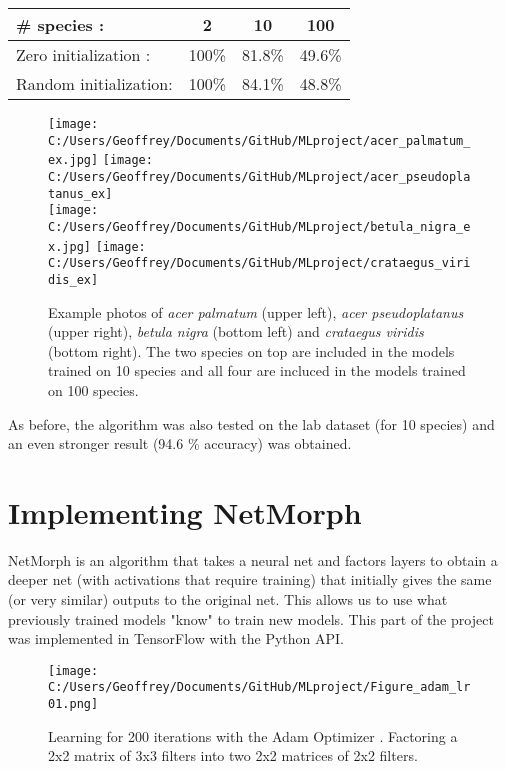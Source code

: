 \documentclass[12pt]{article}
\begin{document}
\begin{center}
\begin{tabular}{|l|c|c|c|}
 \hline
 \# species : & 2 & 10 & 100\\
 \hline
 Zero initialization : & 100\% & 81.8\% & 49.6\%\\
 Random initialization: & 100\% & 84.1\% & 48.8\%\\
 \hline
\end{tabular}
\end{center}

\begin{figure}
\texttt{[image: C:/Users/Geoffrey/Documents/GitHub/MLproject/acer\_palmatum\_ex.jpg]} \texttt{[image: C:/Users/Geoffrey/Documents/GitHub/MLproject/acer\_pseudoplatanus\_ex]} \\ \texttt{[image: C:/Users/Geoffrey/Documents/GitHub/MLproject/betula\_nigra\_ex.jpg]} \texttt{[image: C:/Users/Geoffrey/Documents/GitHub/MLproject/crataegus\_viridis\_ex]}
\caption{\label{fig:exphotosmulti} Example photos of \textit{acer palmatum} (upper left), \textit{acer pseudoplatanus} (upper right), \textit{betula nigra} (bottom left) and \textit{crataegus viridis} (bottom right). The two species on top are included in the models trained on 10 species and all four are incluced in the models trained on 100 species.}
\end{figure}

As before, the algorithm was also tested on the lab dataset (for 10 species) and an even stronger result (94.6 \% accuracy) was obtained.

\section{Implementing NetMorph}

NetMorph \cite{NetMorph} is an algorithm that takes a neural net and factors layers to obtain a deeper net (with activations that require training) that initially gives the same (or very similar) outputs to the original net. This allows us to use what previously trained models "know" to train new models. This part of the project was implemented in TensorFlow with the Python API.

\begin{figure}
\texttt{[image: C:/Users/Geoffrey/Documents/GitHub/MLproject/Figure\_adam\_lr01.png]}
\caption{Learning for 200 iterations with the Adam Optimizer \cite{AdamOpt}. Factoring a 2x2 matrix of 3x3 filters into two 2x2 matrices of 2x2 filters.}
\end{figure}
\end{document}
